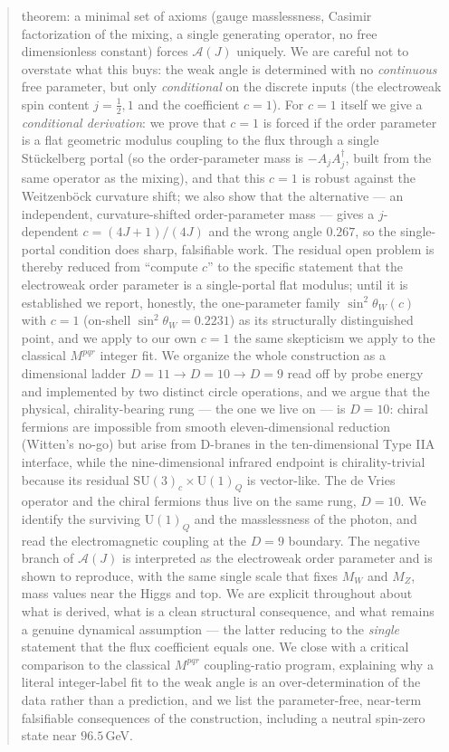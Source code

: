 \documentclass[11pt]{article}
\theoremstyle{plain}
\theoremstyle{definition}
\newcommand{\cA}{\mathcal{A}}
\newcommand{\SU}{\mathrm{SU}}
\newcommand{\U}{\mathrm{U}}
\begin{document}
\begin{abstract}
theorem: a minimal set of axioms (gauge masslessness, Casimir factorization
of the mixing, a single generating operator, no free dimensionless constant)
forces $\cA(J)$ uniquely. We are careful not to overstate what this buys: the
weak angle is determined with no \emph{continuous} free parameter, but only
\emph{conditional} on the discrete inputs (the electroweak spin content
$j=\tfrac12,1$ and the coefficient $c=1$). For $c=1$ itself we give a
\emph{conditional derivation}: we prove that $c=1$ is forced if the order
parameter is a flat geometric modulus coupling to the flux through a single
Stückelberg portal (so the order-parameter mass is $-A_jA_j^\dagger$, built
from the same operator as the mixing), and that this $c=1$ is robust against
the Weitzenb\"ock curvature shift; we also show that the alternative ---
an independent, curvature-shifted order-parameter mass --- gives a
$j$-dependent $c=(4J+1)/(4J)$ and the wrong angle $0.267$, so the single-portal
condition does sharp, falsifiable work. The residual open problem is thereby
reduced from ``compute $c$'' to the specific statement that the electroweak
order parameter is a single-portal flat modulus; until it is established we
report, honestly, the one-parameter family $\sin^2\theta_W(c)$ with $c=1$
(on-shell $\sin^2\theta_W=0.2231$) as its structurally distinguished point,
and we apply to our own $c=1$ the same skepticism we apply to the classical
$M^{pqr}$ integer fit. We organize the whole
construction as a dimensional ladder $D=11\to D=10\to D=9$ read off by probe
energy and implemented by two distinct circle operations, and we argue that
the physical, chirality-bearing rung --- the one we live on --- is $D=10$:
chiral fermions are impossible from smooth eleven-dimensional reduction
(Witten's no-go) but arise from D-branes in the ten-dimensional Type IIA
interface, while the nine-dimensional infrared endpoint is chirality-trivial
because its residual $\SU(3)_c\times\U(1)_Q$ is vector-like. The de Vries
operator and the chiral fermions thus live on the same rung, $D=10$. We
identify the surviving $\U(1)_Q$ and the masslessness of the photon, and read
the electromagnetic coupling at the $D=9$ boundary. The negative branch of $\cA(J)$ is interpreted as the
electroweak order parameter and is shown to reproduce, with the same
single scale that fixes $M_W$ and $M_Z$, mass values near the Higgs and
top. We are explicit throughout about what is derived, what is a clean
structural consequence, and what remains a genuine dynamical assumption
--- the latter reducing to the \emph{single} statement that the flux
coefficient equals one. We close with a critical comparison to the
classical $M^{pqr}$ coupling-ratio program, explaining why a literal
integer-label fit to the weak angle is an over-determination of the data
rather than a prediction, and we list the parameter-free, near-term
falsifiable consequences of the construction, including a neutral
spin-zero state near $96.5\,$GeV.
\end{abstract}
\end{document}
